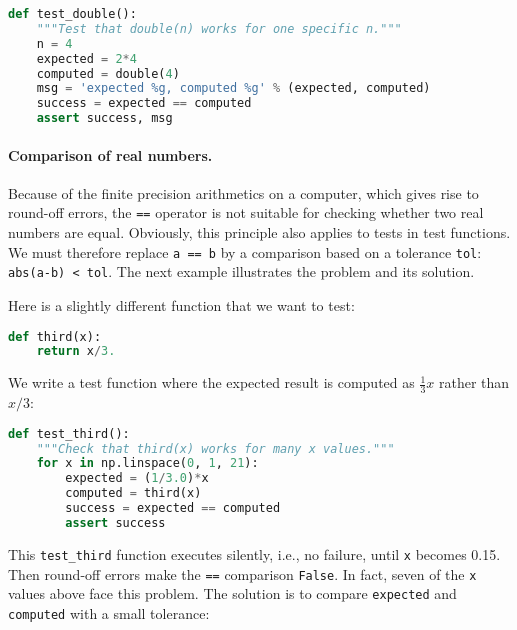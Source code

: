 \documentclass[graybox,sectrefs,envcountresetchap,open=right,final]{svmonodo}
\begin{document}
\begin{lstlisting}[language=python,style=blue1_bluegreen]
def test_double():
    """Test that double(n) works for one specific n."""
    n = 4
    expected = 2*4
    computed = double(4)
    msg = 'expected %g, computed %g' % (expected, computed)
    success = expected == computed
    assert success, msg

\end{lstlisting}


\paragraph{Comparison of real numbers.}
Because of the finite precision arithmetics on a computer, which gives
rise to round-off errors, the \texttt{==} operator is not suitable for
checking whether two real numbers are equal. Obviously, this principle
also applies to tests in test functions.
We must therefore replace \texttt{a == b} by a comparison
based on a tolerance \texttt{tol}: \texttt{abs(a-b) < tol}. The next example illustrates
the problem and its solution.

Here is a slightly different function that
we want to test:




\begin{lstlisting}[language=python,style=blue1_bluegreen]
def third(x):
    return x/3.

\end{lstlisting}

We write a test function where the expected result is computed as
$\frac{1}{3}x$ rather than $x/3$:









\begin{lstlisting}[language=python,style=blue1_bluegreen]
def test_third():
    """Check that third(x) works for many x values."""
    for x in np.linspace(0, 1, 21):
        expected = (1/3.0)*x
        computed = third(x)
        success = expected == computed
        assert success

\end{lstlisting}

This \Verb!test_third! function executes silently, i.e., no failure,
until \texttt{x} becomes 0.15. Then round-off errors make the \texttt{==} comparison
\texttt{False}. In fact, seven of the \texttt{x} values above face this problem.
The solution is to compare \texttt{expected} and \texttt{computed}
with a small tolerance:
\end{document}
